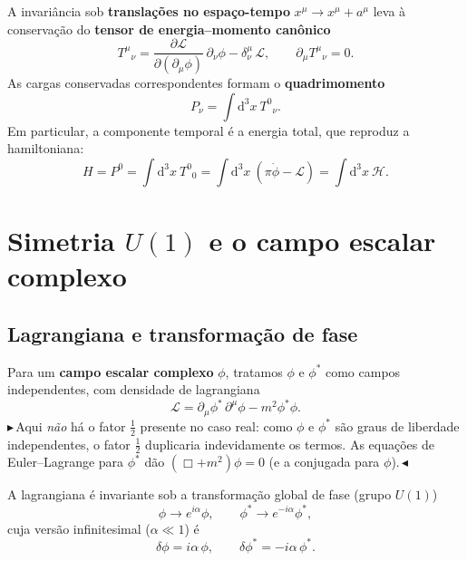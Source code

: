 \documentclass[12pt,a4paper]{article}
\newcommand{\rev}[1]{{\color{revred}\ensuremath{\blacktriangleright}\,#1\,\ensuremath{\blacktriangleleft}}}
\newcommand{\dd}{\mathrm{d}}
\newcommand{\pt}[1]{\partial_{#1}}
\newcommand{\Lag}{\mathcal{L}}
\newcommand{\Ham}{\mathcal{H}}
\renewcommand{\d}{\partial}
\begin{document}
A invariância sob \textbf{translações no espaço-tempo}
$x^{\mu}\to x^{\mu}+a^{\mu}$ leva à conservação do \textbf{tensor de
energia--momento canônico}
\begin{equation}
  T^{\mu}{}_{\nu}
  =\frac{\d\Lag}{\d(\pt{\mu}\phi)}\,\pt{\nu}\phi-\delta^{\mu}_{\nu}\,\Lag,
  \qquad \pt{\mu}T^{\mu}{}_{\nu}=0 .
\end{equation}
As cargas conservadas correspondentes formam o \textbf{quadrimomento}
\begin{equation}
  P_{\nu}=\int \dd^{3}x\ T^{0}{}_{\nu}.
\end{equation}
Em particular, a componente temporal é a energia total, que reproduz a
hamiltoniana:
\begin{equation}
  H=P^{0}=\int\dd^{3}x\ T^{0}{}_{0}
   =\int\dd^{3}x\ (\pi\dot\phi-\Lag)
   =\int\dd^{3}x\ \Ham .
\end{equation}

\section{Simetria \(U(1)\) e o campo escalar complexo}

\subsection{Lagrangiana e transformação de fase}

Para um \textbf{campo escalar complexo} $\phi$, tratamos $\phi$ e
$\phi^{*}$ como campos independentes, com densidade de lagrangiana
\begin{equation}
  \Lag=\pt{\mu}\phi^{*}\,\d^{\mu}\phi-m^{2}\phi^{*}\phi .
\end{equation}
\rev{Aqui \emph{não} há o fator $\tfrac12$ presente no caso real: como
$\phi$ e $\phi^{*}$ são graus de liberdade independentes, o fator $\tfrac12$
duplicaria indevidamente os termos. As equações de Euler--Lagrange para
$\phi^{*}$ dão $(\Box+m^{2})\phi=0$ (e a conjugada para $\phi$).}

A lagrangiana é invariante sob a transformação global de fase (grupo
$U(1)$)
\begin{equation}
  \phi\longrightarrow e^{i\alpha}\phi,\qquad
  \phi^{*}\longrightarrow e^{-i\alpha}\phi^{*},
\end{equation}
cuja versão infinitesimal ($\alpha\ll1$) é
\begin{equation}
  \delta\phi=i\alpha\,\phi,\qquad \delta\phi^{*}=-i\alpha\,\phi^{*}.
\end{equation}
\end{document}
